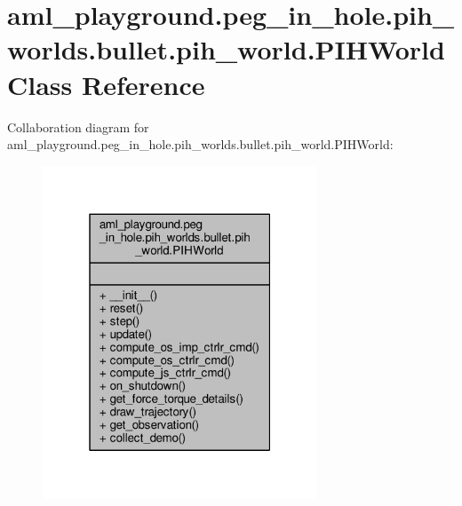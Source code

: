 \hypertarget{classaml__playground_1_1peg__in__hole_1_1pih__worlds_1_1bullet_1_1pih__world_1_1_p_i_h_world}{\section{aml\-\_\-playground.\-peg\-\_\-in\-\_\-hole.\-pih\-\_\-worlds.\-bullet.\-pih\-\_\-world.\-P\-I\-H\-World Class Reference}
\label{classaml__playground_1_1peg__in__hole_1_1pih__worlds_1_1bullet_1_1pih__world_1_1_p_i_h_world}
}


Collaboration diagram for aml\-\_\-playground.\-peg\-\_\-in\-\_\-hole.\-pih\-\_\-worlds.\-bullet.\-pih\-\_\-world.\-P\-I\-H\-World\-:
\nopagebreak
\begin{figure}[H]
\begin{center}
\leavevmode
\includegraphics[width=232pt]{classaml__playground_1_1peg__in__hole_1_1pih__worlds_1_1bullet_1_1pih__world_1_1_p_i_h_world__coll__graph}
\end{center}
\end{figure}
